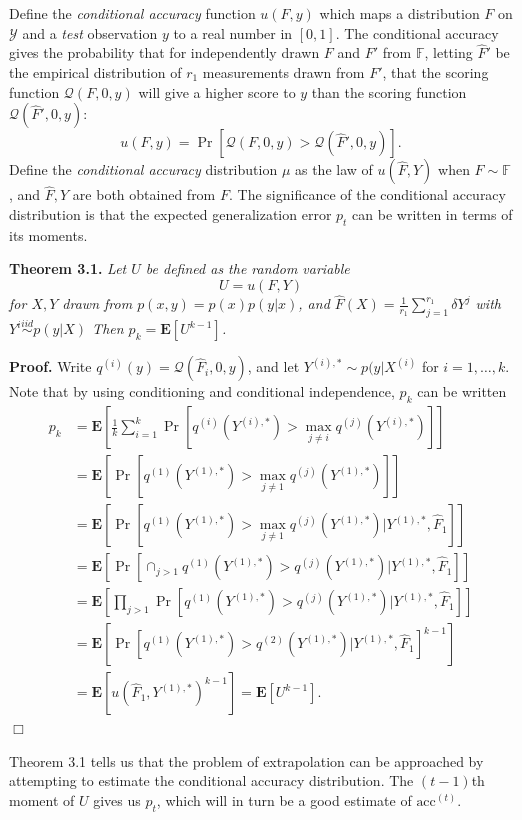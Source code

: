 \documentclass{article}
\newcommand{\E}{\textbf{E}}
\begin{document}
Define the \emph{conditional accuracy} function $u(F, y)$ which maps a
distribution $F$ on $\mathcal{Y}$ and a \emph{test} observation $y$ to
a real number in $[0,1]$.  The conditional accuracy gives the
probability that for independently drawn $F$ and $F'$ from
$\mathbb{F}$, letting $\hat{F}'$ be the empirical distribution of
$r_1$ measurements drawn from $F'$, that the scoring function
$\mathcal{Q}(F, 0, y)$ will give a higher score to $y$ than the
scoring function $\mathcal{Q}(\hat{F}', 0, y)$:
\[
u(F, y) = \Pr[\mathcal{Q}(F, 0, y) > \mathcal{Q}(\hat{F}', 0, y)].
\]
Define the \emph{conditional accuracy} distribution $\mu$ as the law
of $u(\hat{F}, Y)$ when $F \sim \mathbb{F}$, and $\hat{F}, Y$ are both
obtained from $F$.  The significance of the conditional accuracy
distribution is that the expected generalization error $p_t$ can be
written in terms of its moments.

\noindent\textbf{Theorem 3.1.} \emph{
Let $U$ be defined as the random variable
\[U = u(F, Y)\]
for $X, Y$ drawn from $p(x, y) = p(x) p(y|x)$,
and $\hat{F}(X) = \frac{1}{r_1}\sum_{j=1}^{r_1} \delta{Y^j}$ with $Y^i \stackrel{iid}{\sim} p(y|X)$
Then $p_k = \E[U^{k-1}]$.
}

\noindent\textbf{Proof.}  
Write $q^{(i)}(y) = \mathcal{Q}(\hat{F}_i, 0, y)$, and let $Y^{(i), *} \sim p(y|X^{(i)}$ for $i = 1,\hdots, k$.
Note that by using conditioning and
conditional independence, $p_k$ can be written
\begin{align*}
p_k &= \E\left[ \frac{1}{k}\sum_{i=1}^k  \Pr[q^{(i)}(Y^{(i), *}) > \max_{j\neq i} q^{(j)}(Y^{(i), *})] \right]
\\&= \E\left[ \Pr[q^{(1)}(Y^{(1), *}) > \max_{j\neq 1} q^{(j)}(Y^{(1), *})] \right]
\\&= \E[\Pr[q^{(1)}(Y^{(1), *}) > \max_{j\neq 1} q^{(j)}(Y^{(1), *})|Y^{(1), *}, \hat{F}_1]]
\\&= \E[\Pr[\cap_{j > 1} q^{(1)}(Y^{(1), *}) > q^{(j)}(Y^{(1), *})|Y^{(1), *}, \hat{F}_1]]
\\&= \E[\prod_{j > 1}\Pr[q^{(1)}(Y^{(1), *}) > q^{(j)}(Y^{(1), *})|Y^{(1), *}, \hat{F}_1]]
\\&= \E[\Pr[q^{(1)}(Y^{(1), *}) > q^{(2)}(Y^{(1), *})|Y^{(1), *}, \hat{F}_1]^{k-1}]
\\&= \E[u(\hat{F}_1, Y^{(1), *})^{k-1}] = \E[U^{k-1}].
\end{align*}
$\Box$

Theorem 3.1 tells us that the problem of extrapolation can be
approached by attempting to estimate the conditional accuracy
distribution.  The $(t-1)$th moment of $U$ gives us $p_t$, which will
in turn be a good estimate of $\text{acc}^{(t)}$.
\end{document}
